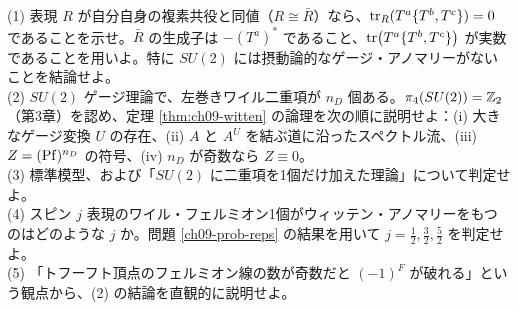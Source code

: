 \begin{problem}[難易度 C]\label{ch09-prob-witten}
(1) 表現 $R$ が自分自身の複素共役と同値（$R\cong\bar R$）なら、$\tr_R(T^a\{T^b,T^c\})=0$ であることを示せ。$\bar R$ の生成子は $-(T^a)^*$ であること、$\tr(T^a\{T^b,T^c\})$ が実数であることを用いよ。特に $SU(2)$ には摂動論的なゲージ・アノマリーがないことを結論せよ。\\
(2) $SU(2)$ ゲージ理論で、左巻きワイル二重項が $n_D$ 個ある。$\pi_4(SU(2))=\mathbb{Z}_2$（第3章）を認め、定理 \ref{thm:ch09-witten} の論理を次の順に説明せよ：(i) 大きなゲージ変換 $U$ の存在、(ii) $A$ と $A^U$ を結ぶ道に沿ったスペクトル流、(iii) $Z=(\operatorname{Pf})^{n_D}$ の符号、(iv) $n_D$ が奇数なら $Z\equiv0$。\\
(3) 標準模型、および「$SU(2)$ に二重項を1個だけ加えた理論」について判定せよ。\\
(4) スピン $j$ 表現のワイル・フェルミオン1個がウィッテン・アノマリーをもつのはどのような $j$ か。問題 \ref{ch09-prob-reps} の結果を用いて $j=\frac12,\frac32,\frac52$ を判定せよ。\\
(5) 「トフーフト頂点のフェルミオン線の数が奇数だと $(-1)^F$ が破れる」という観点から、(2) の結論を直観的に説明せよ。
\end{problem}

